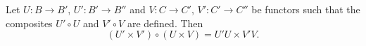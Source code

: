 Let $U: B \to B'$, $U': B' \to B''$ and $V: C \to C'$, $V': C' \to C''$ be functors such that the composites $U' \circ U$ and $V' \circ V$ are defined. Then
$$(U' \times V') \circ (U \times V) = U'U \times V'V.$$
